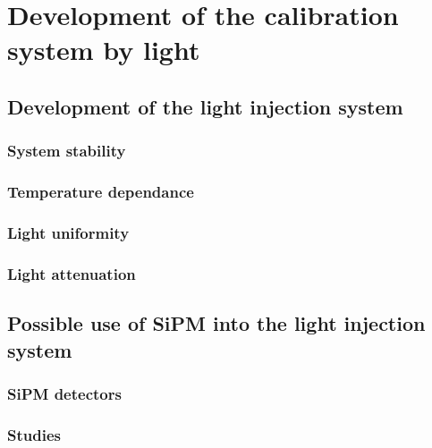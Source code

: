 \documentclass[main.tex]{subfiles}
\begin{document}
\chapter{Development of the calibration system by light}

\section{Development of the light injection system}
\subsection{System stability}
\subsection{Temperature dependance}
\subsection{Light uniformity}
\subsection{Light attenuation}


\section{Possible use of SiPM into the light injection system}
\subsection{SiPM detectors}
\subsection{Studies}
\end{document}
